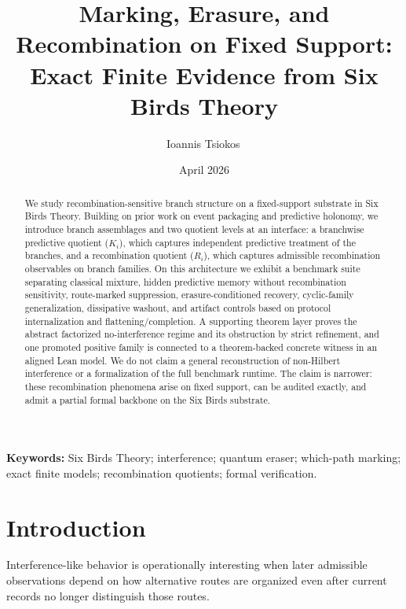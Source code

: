 \documentclass[11pt]{article}
\title{Marking, Erasure, and Recombination on Fixed Support: Exact Finite Evidence from Six Birds Theory}
\author{Ioannis Tsiokos\,\orcidlink{0009-0009-7659-5964}}
\date{April 2026}
\theoremstyle{definition}
\begin{document}
\maketitle
\thispagestyle{firstpage}

\begin{abstract}
We study recombination-sensitive branch structure on a fixed-support substrate in Six Birds Theory. Building on prior work on event packaging and predictive holonomy, we introduce branch assemblages and two quotient levels at an interface: a branchwise predictive quotient ($K_i$), which captures independent predictive treatment of the branches, and a recombination quotient ($R_i$), which captures admissible recombination observables on branch families. On this architecture we exhibit a benchmark suite separating classical mixture, hidden predictive memory without recombination sensitivity, route-marked suppression, erasure-conditioned recovery, cyclic-family generalization, dissipative washout, and artifact controls based on protocol internalization and flattening/completion. A supporting theorem layer proves the abstract factorized no-interference regime and its obstruction by strict refinement, and one promoted positive family is connected to a theorem-backed concrete witness in an aligned Lean model. We do not claim a general reconstruction of non-Hilbert interference or a formalization of the full benchmark runtime. The claim is narrower: these recombination phenomena arise on fixed support, can be audited exactly, and admit a partial formal backbone on the Six Birds substrate.
\end{abstract}

\medskip
\noindent\textbf{Keywords:} Six Birds Theory; interference; quantum eraser; which-path marking; exact finite models; recombination quotients; formal verification.

\section{Introduction}

Interference-like behavior is operationally interesting when later admissible observations depend on how alternative routes are organized even after current records no longer distinguish those routes.
\end{document}
